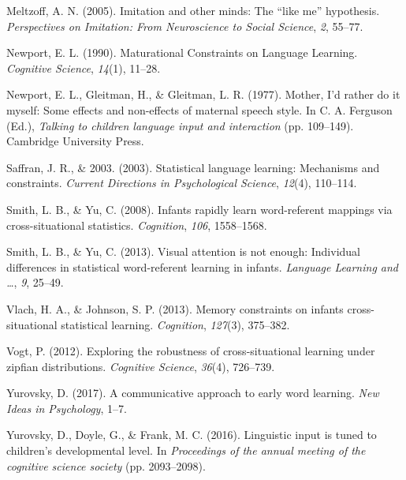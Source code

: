 \documentclass[10pt, letterpaper]{article}
\begin{document}
\leavevmode\hypertarget{ref-meltzoff2005}{}%
Meltzoff, A. N. (2005). Imitation and other minds: The ``like me''
hypothesis. \emph{Perspectives on Imitation: From Neuroscience to Social
Science}, \emph{2}, 55--77.

\leavevmode\hypertarget{ref-newport1990}{}%
Newport, E. L. (1990). Maturational Constraints on Language Learning.
\emph{Cognitive Science}, \emph{14}(1), 11--28.

\leavevmode\hypertarget{ref-newport1977}{}%
Newport, E. L., Gleitman, H., \& Gleitman, L. R. (1977). Mother, I'd
rather do it myself: Some effects and non-effects of maternal speech
style. In C. A. Ferguson (Ed.), \emph{Talking to children language input
and interaction} (pp. 109--149). Cambridge University Press.

\leavevmode\hypertarget{ref-saffran2003}{}%
Saffran, J. R., \& 2003. (2003). Statistical language learning:
Mechanisms and constraints. \emph{Current Directions in Psychological
Science}, \emph{12}(4), 110--114.

\leavevmode\hypertarget{ref-smith2008}{}%
Smith, L. B., \& Yu, C. (2008). Infants rapidly learn word-referent
mappings via cross-situational statistics. \emph{Cognition}, \emph{106},
1558--1568.

\leavevmode\hypertarget{ref-smith2013}{}%
Smith, L. B., \& Yu, C. (2013). Visual attention is not enough:
Individual differences in statistical word-referent learning in infants.
\emph{Language Learning and \ldots{}}, \emph{9}, 25--49.

\leavevmode\hypertarget{ref-vlach2013}{}%
Vlach, H. A., \& Johnson, S. P. (2013). Memory constraints on infants
cross-situational statistical learning. \emph{Cognition}, \emph{127}(3),
375--382.

\leavevmode\hypertarget{ref-vogt2012}{}%
Vogt, P. (2012). Exploring the robustness of cross-situational learning
under zipfian distributions. \emph{Cognitive Science}, \emph{36}(4),
726--739.

\leavevmode\hypertarget{ref-yurovsky2017}{}%
Yurovsky, D. (2017). A communicative approach to early word learning.
\emph{New Ideas in Psychology}, 1--7.

\leavevmode\hypertarget{ref-yurovsky2016}{}%
Yurovsky, D., Doyle, G., \& Frank, M. C. (2016). Linguistic input is
tuned to children's developmental level. In \emph{Proceedings of the
annual meeting of the cognitive science society} (pp. 2093--2098).


\end{document}
